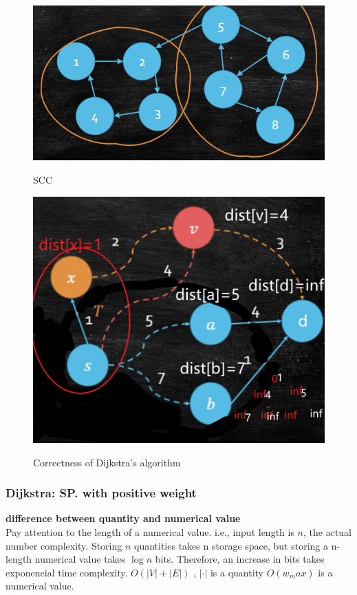 \begin{figure}[htbp]
    \begin{minipage}{0.5\linewidth}
        \centering
        \includegraphics[width=0.8\linewidth]{Notes/fig/SCC.png}
        \caption{SCC}
        \label{fig:SCC}
    \end{minipage}
    \begin{minipage}{0.5\linewidth}
        \centering
        \label{fig:dijk}
        \includegraphics[width=0.5\linewidth]{Notes/fig/dijk.png}
        \caption{Correctness of Dijkstra's algorithm}
    \end{minipage}
\end{figure}




\subsubsection{Dijkstra: SP. with positive weight}
\begin{remark} \textbf{difference between quantity and numerical value}\\
    Pay attention to the length of a numerical value. i.e., input length is $n$, the actual number complexity.
    Storing $n$ quantities takes n storage space, but storing a n-length numerical value takes $\log n$ bits. Therefore, an increase in bits takes exponencial time complexity.
    $O(|V|+|E|)$ , $|\cdot|$ is a quantity
    $O(w_max)$ is a numerical value.
\end{remark}

